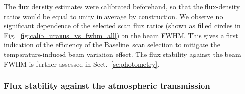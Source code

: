 \documentclass[traditionalabstract]{aa}
\newcommand{\baseline}{Baseline}%
\newcommand{\lp}[1]{#1}
\begin{document}
{The flux density estimates were calibrated beforehand, so that the flux-density ratios would be equal to unity in average by construction.
We observe no significant dependence of the selected scan flux ratios
(shown as filled circles in Fig.~\ref{fig:calib_uranus_vs_fwhm_all})
on the beam FWHM. {\lp This gives a first indication of the efficiency
  of the \baseline\ scan selection to mitigate the
temperature-induced beam variation effect. The flux stability against
the beam FWHM is further assessed in Sect.~\ref{se:photometry}.}


\subsubsection{Flux stability against the atmospheric transmission}
\label{se:baseline_calibration_atm}

}
\end{document}
